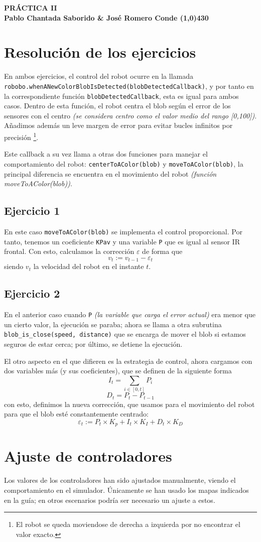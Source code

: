 \documentclass{article}
\begin{document}
\begin{center}
    \LARGE\bfseries PRÁCTICA II\\
    \small Pablo Chantada Saborido \& José Romero Conde
    \line(1,0){430}
\end{center}


\section*{Resolución de los ejercicios}
En ambos ejercicios, el control del robot ocurre en la llamada \texttt{robobo.whenANewColorBlobIsDetected(blobDetectedCallback)}, y por tanto en la correspondiente función \texttt{blobDetectedCallback}, esta es igual para ambos casos. Dentro de esta función, el robot centra el blob según el error de los sensores con el centro \textit{(se considera centro como el valor medio del rango [0,100])}. Añadimos además un leve margen de error para evitar bucles infinitos por precisión \footnote{El robot se queda moviendose de derecha a izquierda por no encontrar el valor exacto.}. 

Este callback a su vez llama a otras dos funciones para manejar el comportamiento del robot: \texttt{centerToAColor(blob)} y \texttt{moveToAColor(blob)}, la principal diferencia se encuentra en el movimiento del robot \textit{(función moveToAColor(blob))}. 

\subsection*{Ejercicio 1}
En este caso \texttt{moveToAColor(blob)} se implementa el control proporcional. Por tanto, tenemos un coeficiente \texttt{KPav}
y una variable \texttt{P} que es igual al sensor IR frontal. Con esto, calculamos la corrección $\varepsilon$ de forma que \[ v_t := v_{t-1} - \varepsilon_t \] siendo $v_t$ la velocidad del robot en el instante $t$.

\subsection*{Ejercicio 2}
En el anterior caso cuando \texttt{P} \textit{(la variable que carga el error actual)} era menor que un cierto valor, la ejecución se paraba; ahora se llama a otra subrutina \texttt{blob\_is\_close(speed, distance)} que se encarga de mover el blob si estamos seguros de estar cerca; por último, se detiene la ejecución. 

El otro aspecto en el que difieren es la estrategia de control, ahora cargamos con dos variables más (y sus coeficientes), que se definen de la siguiente forma \[I_t = \sum_{i \in [0,t]} P_i \] \[D_t = P_t - P_{t-1}\] con esto, definimos la nueva corrección, que usamos para el movimiento del robot para que el blob esté constantemente centrado: \[\varepsilon_t := P_t\times K_p + I_t \times K_I + D_t \times K_D\]
\section*{Ajuste de controladores}
Los valores de los controladores han sido ajustados manualmente, viendo el comportamiento en el simulador. Únicamente se han usado los mapas indicados en la guía; en otros escenarios podría ser necesario un ajuste a estos.
\end{document}
